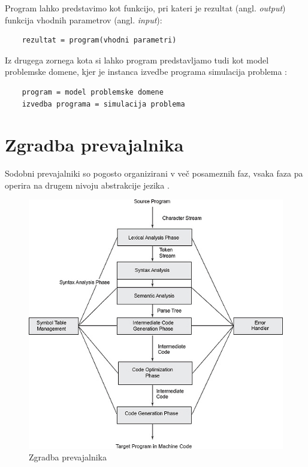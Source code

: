 \documentclass[a4paper, 12p]{book}
\begin{document}
Program lahko predstavimo kot funkcijo, pri kateri je rezultat (angl. \textit{output}) funkcija vhodnih parametrov (angl. \textit{input}):
\begin{lstlisting}
	rezultat = program(vhodni parametri)
\end{lstlisting}

Iz drugega zornega kota si lahko program predstavljamo tudi kot model problemske domene, kjer je instanca izvedbe programa simulacija problema \cite{computationalModel}:
\begin{lstlisting}
	program = model problemske domene
	izvedba programa = simulacija problema
\end{lstlisting}

\section{Zgradba prevajalnika}

Sodobni prevajalniki so pogosto organizirani v več posameznih faz, vsaka faza pa operira na drugem nivoju abstrakcije jezika \cite{modernCompiler}.

\begin{figure}[h]
	\begin{center}
		\includegraphics[width=1\textwidth]{resources/compilerStructure.jpg}
	\end{center}
	\caption{Zgradba prevajalnika \cite{compilerStructure}}
	\label{pic1}
\end{figure}
\end{document}
